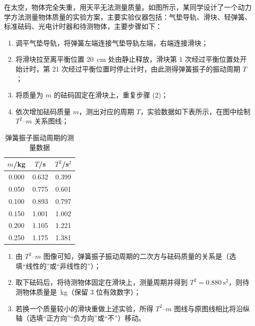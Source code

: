 \begin{question}
在太空，物体完全失重，用天平无法测量质量。如图所示，某同学设计了一个动力学方法测量物体质量的实验方案，主要实验仪器包括：气垫导轨、滑块、轻弹簧、标准砝码、光电计时器和待测物体，主要步骤如下：


\begin{enumerate}[leftmargin=2em, label=(\arabic*)]
  \item 调平气垫导轨，将弹簧左端连接气垫导轨左端，右端连接滑块；
  \item 将滑块拉至离平衡位置 \SI{20}{\centi\metre} 处由静止释放，滑块第 1 次经过平衡位置处开始计时，第 21 次经过平衡位置时停止计时，由此测得弹簧振子的振动周期 $T$；
  \item 将质量为 $m$ 的砝码固定在滑块上，重复步骤 (2)；
  \item 依次增加砝码质量 $m$，测出对应的周期 $T$，实验数据如下表所示，在图中绘制 $T^{2}$--$m$ 关系图线；
\end{enumerate}

\begin{table}[ht]
\centering
\caption{弹簧振子振动周期的测量数据}
\small
\begin{tabular}{ccc}
\toprule
$m$/kg & $T$/s & $T^{2}$/s$^{2}$\\
\midrule
0.000 & 0.632 & 0.399\\
0.050 & 0.775 & 0.601\\
0.100 & 0.893 & 0.797\\
0.150 & 1.001 & 1.002\\
0.200 & 1.105 & 1.221\\
0.250 & 1.175 & 1.381\\
\bottomrule
\end{tabular}
\end{table}

\begin{enumerate}[leftmargin=2em, label=(\arabic*), resume]
  \item 由 $T^{2}$--$m$ 图像可知，弹簧振子振动周期的二次方与砝码质量的关系是\gkblank（选填“线性的”或“非线性的”）；
  \item 取下砝码后，将待测物体固定在滑块上，测量周期并得到 $T^{2}=\SI{0.880}{\second\squared}$，则待测物体质量是\gkblank~kg（保留 3 位有效数字）；
  \item 若换一个质量较小的滑块重做上述实验，所得 $T^{2}$--$m$ 图线与原图线相比将沿纵轴\gkblank（选填“正方向”“负方向”或“不”）移动。
\end{enumerate}

\end{question}

